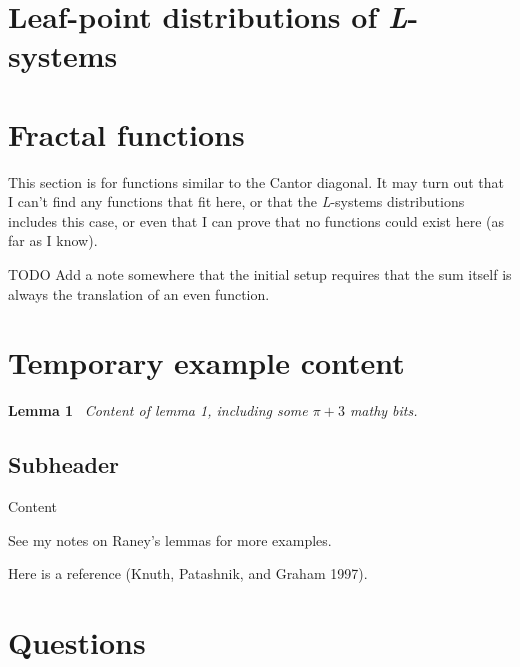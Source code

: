 \documentclass[]{article}
\begin{document}
\section{\texorpdfstring{Leaf-point distributions of
\emph{L}-systems}{Leaf-point distributions of L-systems}}\label{leaf-point-distributions-of-l-systems}

\section{Fractal functions}\label{fractal-functions}

This section is for functions similar to the Cantor diagonal. It may
turn out that I can't find any functions that fit here, or that the
\emph{L}-systems distributions includes this case, or even that I can
prove that no functions could exist here (as far as I know).

TODO Add a note somewhere that the initial setup requires that the sum
itself is always the translation of an even function.

\section{Temporary example content}\label{temporary-example-content}

\textbf{Lemma 1}~ \emph{Content of lemma 1, including some \(\pi+3\)
mathy bits.}

\subsection{Subheader}\label{subheader}

Content

See my notes on Raney's lemmas for more examples.

Here is a reference (Knuth, Patashnik, and Graham 1997).

\section{Questions}\label{questions}
\end{document}
